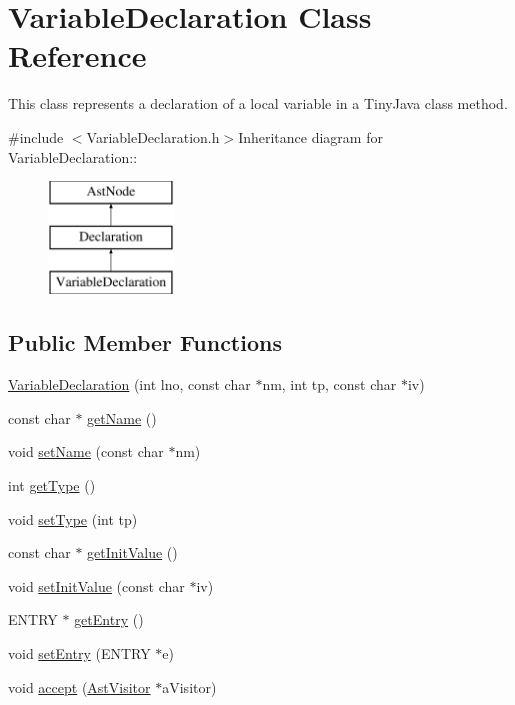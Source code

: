 \hypertarget{classVariableDeclaration}{
\section{VariableDeclaration Class Reference}
\label{classVariableDeclaration}
}


This class represents a declaration of a local variable in a TinyJava class method.  


{\ttfamily \#include $<$VariableDeclaration.h$>$}Inheritance diagram for VariableDeclaration::\begin{figure}[H]
\begin{center}
\leavevmode
\includegraphics[height=3cm]{classVariableDeclaration}
\end{center}
\end{figure}
\subsection*{Public Member Functions}
\begin{DoxyCompactItemize}
\item 
\hyperlink{classVariableDeclaration_a4d671e248b007508b41e69a6c0571957}{VariableDeclaration} (int lno, const char $\ast$nm, int tp, const char $\ast$iv)
\item 
const char $\ast$ \hyperlink{classVariableDeclaration_a0651102c92331f832679816bccd08ddd}{getName} ()
\item 
void \hyperlink{classVariableDeclaration_a87d34512598049ef3f1d945451873ab5}{setName} (const char $\ast$nm)
\item 
int \hyperlink{classVariableDeclaration_a1384f2df0a1fcc9d2f55a20d4db0d34b}{getType} ()
\item 
void \hyperlink{classVariableDeclaration_a3fbc1e04d3d8e6aa487ced5215347b51}{setType} (int tp)
\item 
const char $\ast$ \hyperlink{classVariableDeclaration_ad4e01c324003e1730afcfe3a231ee2a0}{getInitValue} ()
\item 
void \hyperlink{classVariableDeclaration_a4bdb316526fd2c35221c6b65aa667bc7}{setInitValue} (const char $\ast$iv)
\item 
ENTRY $\ast$ \hyperlink{classVariableDeclaration_a42520812cc7fd155b4d30852ca1c68f7}{getEntry} ()
\item 
void \hyperlink{classVariableDeclaration_a42cfc2417b553b93190b937d7413a32c}{setEntry} (ENTRY $\ast$e)
\item 
void \hyperlink{classVariableDeclaration_af8e0086b00a9bc45f2aff7bf91d8f17d}{accept} (\hyperlink{classAstVisitor}{AstVisitor} $\ast$aVisitor)
\end{DoxyCompactItemize}


